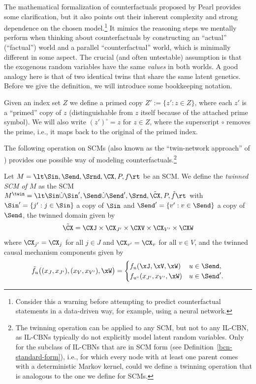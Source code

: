 The mathematical formalization of counterfactuals proposed by Pearl provides some clarification, but it also points out their 
inherent complexity and strong dependence on the chosen model.\footnote{Consider this a warning before attempting to 
predict counterfactual statements in a data-driven way, for example, using a neural network.}
It mimics the reasoning steps we mentally perform when thinking about counterfactuals by constructing an ``actual''
(``factual'') world and a parallel ``counterfactual'' world, which is minimally different in some aspect.
The crucial (and often untestable) assumption is that the exogenous random variables have the same \emph{values} in both worlds.
A good analogy here is that of two identical twins that share the same latent genetics. 
Before we give the definition, we will introduce some bookkeeping notation.
\begin{Not}
  Given an index set $Z$ we define a primed copy $Z' := \{z' : z \in Z\}$, where each $z'$ is a ``primed'' copy of $z$ 
  (distinguishable from $z$ itself because of the attached prime symbol). 
  We will also write $(z')^\circ = z$ for $z \in Z$, where the superscript $\circ$ removes the prime, i.e., it
  maps back to the original of the primed index.
\end{Not}
The following operation on SCMs (also known as the ``twin-network approach'' of \cite{BalkePearl1994a}) provides one possible way of modeling counterfactuals.\footnote{The twinning operation can be applied to any SCM, but not to any IL-CBN, as IL-CBNs typically do not explicitly model latent random variables. Only for the subclass of IL-CBNs that are in SCM form (see Definition~\ref{bcn-standard-form}), i.e., for which every node with at least one parent comes with a deterministic Markov kernel, could we define a twinning operation that is analogous to the one we define for SCMs.}
\begin{Def}
  Let $M = \lt \Sin, \Send, \Srnd, \CX, P, f \rt$ be an SCM. We define the \emph{twinned SCM of $M$} as
  the SCM $M^\twin = \lt \Sin \dot\cup \Sin', \Send \dot\cup \Send', \Srnd, \tilde{\CX}, P, \tilde{f} \rt$
  with $\Sin' = \{j' : j \in \Sin\}$ a copy of $\Sin$ and
  $\Send' = \{v' : v \in \Send\}$ a copy of $\Send$, the twinned domain given by
  $$\tilde{\CX} = \CXJ \times \CX_{J'} \times \CXV \times \CX_{V'} \times \CXW$$
  where $\CX_{j'} = \CX_j$ for all $j \in J$ and $\CX_{v'} = \CX_v$ for all $v \in V$,
  and the twinned causal mechanism components given by
  $$\tilde{f}_u\big((x_J,x_{J'}),(x_V,x_{V'}),\xW\big) = 
  \begin{cases}
    f_u(\xJ,\xV,\xW) & u \in \Send,  \\
    f_{u^\circ}(x_{J'},x_{V'},\xW) & u \in \Send'.
  \end{cases}$$
\end{Def}
